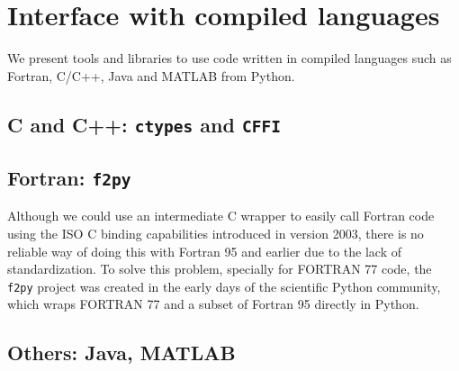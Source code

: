 \section{Interface with compiled languages}
\label{sec:interface}

We present tools and libraries to use code written in compiled languages such as Fortran, C/C++, Java and MATLAB from Python.

\subsection{C and C++: \verb|ctypes| and \verb|CFFI|}

\subsection{Fortran: \verb|f2py|}

Although we could use an intermediate C wrapper to easily call Fortran code using the ISO C binding capabilities introduced in version 2003, there is no reliable way of doing this with Fortran 95 and earlier due to the lack of standardization. To solve this problem, specially for FORTRAN 77 code, the \verb|f2py| project was created in the early days of the scientific Python community, which wraps FORTRAN 77 and a subset of Fortran 95 directly in Python\cite{peterson2009f2py}.

\subsection{Others: Java, MATLAB}